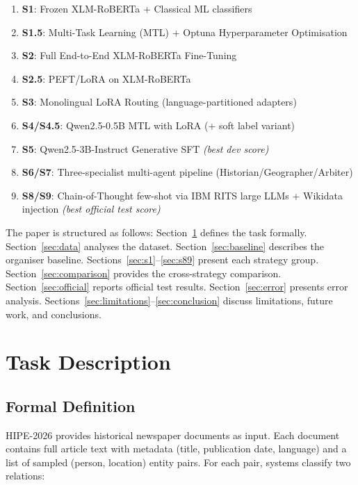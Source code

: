 \documentclass{ceurart}
\begin{document}
\begin{enumerate}
  \item \textbf{S1}: Frozen XLM-RoBERTa + Classical ML classifiers
  \item \textbf{S1.5}: Multi-Task Learning (MTL) + Optuna Hyperparameter Optimisation
  \item \textbf{S2}: Full End-to-End XLM-RoBERTa Fine-Tuning
  \item \textbf{S2.5}: PEFT/LoRA on XLM-RoBERTa
  \item \textbf{S3}: Monolingual LoRA Routing (language-partitioned adapters)
  \item \textbf{S4/S4.5}: Qwen2.5-0.5B MTL with LoRA (+ soft label variant)
  \item \textbf{S5}: Qwen2.5-3B-Instruct Generative SFT \emph{(best dev score)}
  \item \textbf{S6/S7}: Three-specialist multi-agent pipeline (Historian/Geographer/Arbiter)
  \item \textbf{S8/S9}: Chain-of-Thought few-shot via IBM RITS large LLMs + Wikidata injection \emph{(best official test score)}
\end{enumerate}

The paper is structured as follows: Section~\ref{sec:task} defines the task formally. Section~\ref{sec:data} analyses the dataset. Section~\ref{sec:baseline} describes the organiser baseline. Sections~\ref{sec:s1}--\ref{sec:s89} present each strategy group. Section~\ref{sec:comparison} provides the cross-strategy comparison. Section~\ref{sec:official} reports official test results. Section~\ref{sec:error} presents error analysis. Sections~\ref{sec:limitations}--\ref{sec:conclusion} discuss limitations, future work, and conclusions.

\section{Task Description}
\label{sec:task}

\subsection{Formal Definition}

HIPE-2026 provides historical newspaper documents as input. Each document contains full article text with metadata (title, publication date, language) and a list of sampled (person, location) entity pairs. For each pair, systems classify two relations:
\end{document}
